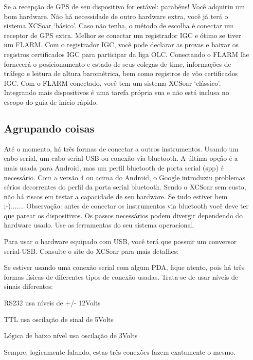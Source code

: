 \documentclass[a4paper,12pt]{refrep}
\begin{document}
Se a recepção de GPS de seu dispositivo for estável: parabéns!  Você adquiriu um bom hardware.  Não há necessidade de outro hardware extra, você já terá o sistema XCSoar ‘básico’.  Caso não tenha, o método de escolha é conectar um receptor de GPS extra.  Melhor se conectar um registrador IGC e ótimo se tiver um FLARM.  Com o registrador IGC, você pode declarar as provas e baixar os registros certificados IGC para participar da liga OLC.  Conectando o FLARM lhe fornecerá o posicionamento e estado de seus colegas de time, informações de tráfego e leitura de altura barométrica, bem como registros de vôo certificados IGC.  Com o FLARM conectado, você tem um sistema XCSoar ‘clássico’.  Integrando mais dispositivos é uma tarefa própria sua e não está inclusa no escopo do guia de início rápido.

\subsection{\textcolor{flashblue}{Agrupando coisas}}
Até o momento, há três formas de conectar a outros instrumentos.  Usando um cabo serial, um cabo serial-USB ou conexão via bluetooth.  A última opção é a mais usada para Android, mas um perfil bluetooth de porta serial (spp) é necessário.  Com a versão 4 ou acima do Android, o Google introduziu problemas sérios decorrentes do perfil da porta serial bluetooth.  Sendo o XCSoar sem custo, não há riscos em testar a capacidade de seu hardware.  Se tudo estiver bem ;-).......
Observação: antes de conectar os instrumentos via bluetooth você deve ter que parear os dispositivos.  Os passos necessários podem divergir dependendo do hardware usado.  Use as ferramentas do seu sistema operacional.

Para usar o hardware equipado com USB, você terá que possuir um conversor serial-USB.  Consulte o site do XCSoar para mais detalhes: {}

Se estiver usando uma conexão serial com algum PDA, fique atento, pois há três formas físicas de diferentes tipos de conexão usadas.  Trata-se de usar níveis de sinais diferentes:

\begin{compactitem}
\item RS232 usa níveis de +/- 12Volts
\item TTL usa oscilação de sinal de 5Volts
\item Lógica de baixo nível usa oscilação de 3Volts
\end{compactitem}
Sempre, logicamente falando, estas três conexões fazem exatamente o mesmo. 
\end{document}
